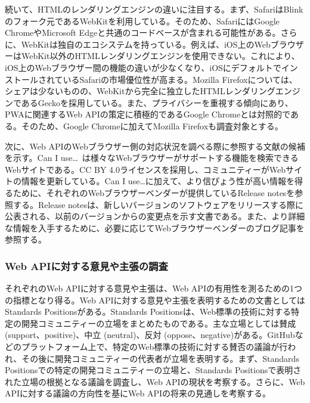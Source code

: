 続いて、HTMLのレンダリングエンジンの違いに注目する。まず、SafariはBlinkのフォーク元であるWebKitを利用している。そのため、SafariにはGoogle ChromeやMicrosoft Edgeと共通のコードベースが含まれる可能性がある。さらに、WebKitは独自のエコシステムを持っている。例えば、iOS上のWebブラウザーはWebKit以外のHTMLレンダリングエンジンを使用できない。これにより、iOS上のWebブラウザー間の機能の違いが少なくなり、iOSにデフォルトでインストールされているSafariの市場優位性が高まる。Mozilla Firefoxについては、シェアは少ないものの、WebKitから完全に独立したHTMLレンダリングエンジンであるGeckoを採用している。また、プライバシーを重視する傾向にあり、PWAに関連するWeb APIの策定に積極的であるGoogle Chromeとは対照的である。そのため、Google Chromeに加えてMozilla Firefoxも調査対象とする。

次に、Web APIのWebブラウザー側の対応状況を調べる際に参照する文献の候補を示す。Can I use…~\cite{CanIUse}は様々なWebブラウザーがサポートする機能を検索できるWebサイトである。CC BY 4.0ライセンスを採用し、コミュニティーがWebサイトの情報を更新している。Can I use…に加えて、より信ぴょう性が高い情報を得るために、それぞれのWebブラウザーベンダーが提供しているRelease notesを参照する。Release notesは、新しいバージョンのソフトウェアをリリースする際に公表される、以前のバージョンからの変更点を示す文書である。また、より詳細な情報を入手するために、必要に応じてWebブラウザーベンダーのブログ記事を参照する。
\subsubsection{Web APIに対する意見や主張の調査}
\label{subsubsection:Web APIに対する意見や主張の調査}
それぞれのWeb APIに対する意見や主張は、Web APIの有用性を測るための1つの指標となり得る。Web APIに対する意見や主張を表明するための文書としてはStandards Positionsがある。Standards Positionsは、Web標準の技術に対する特定の開発コミュニティーの立場をまとめたものである。主な立場としては賛成 (support、positive)、中立 (neutral)、反対 (oppose、negative)がある。GitHubなどのプラットフォーム上で、特定のWeb標準の技術に対する賛否の議論が行われ、その後に開発コミュニティーの代表者が立場を表明する。まず、Standards Positionsでの特定の開発コミュニティーの立場と、Standards Positionsで表明された立場の根拠となる議論を調査し、Web APIの現状を考察する。さらに、Web APIに対する議論の方向性を基にWeb APIの将来の見通しを考察する。

